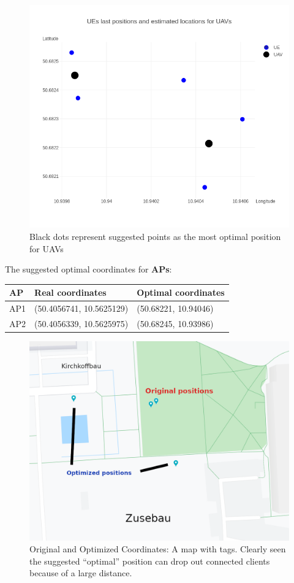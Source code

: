 \begin{figure}[H]
	\centering
	\includegraphics[width=\linewidth,keepaspectratio]{images/Expt4_Estimated UAVs_locations.png}
\caption{Black dots represent suggested points as the most optimal
position for UAVs}
\end{figure}

The suggested optimal coordinates for \textbf{APs}:

\begin{longtable}[]{@{}lll@{}}
\toprule
AP & Real coordinates & Optimal coordinates\tabularnewline
\midrule
\endhead
AP1 & (50.4056741, 10.5625129) & (50.68221, 10.94046)\tabularnewline
AP2 & (50.4056339, 10.5625975) & (50.68245, 10.93986)\tabularnewline
\bottomrule
\end{longtable}

\begin{figure}[H]
	\centering
	\includegraphics[width=\linewidth,keepaspectratio]{images/Expt4_Result_of_optimization_map_with_names.png}
\caption{Original and Optimized Coordinates: A map with tags. Clearly
seen the suggested ``optimal'' position can drop out connected clients
because of a large distance.}
\end{figure}

